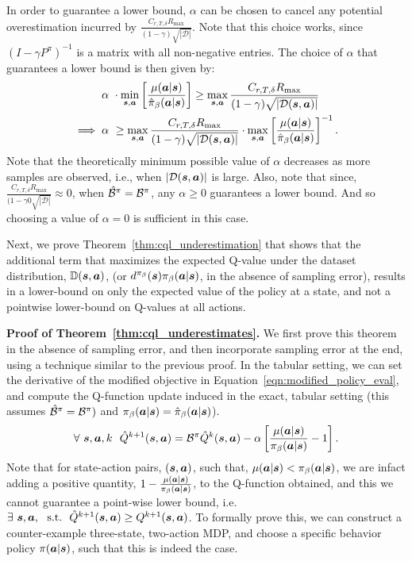 In order to guarantee a lower bound, $\alpha$ can be chosen to cancel any potential overestimation incurred by $\frac{C_{r, T, \delta} R_{\max}}{(1 - \gamma)\sqrt{|\mathcal{D}|}}$. Note that this  choice works, since $(I - \gamma P^\pi)^{-1}$ is a matrix with all non-negative entries. The choice of $\alpha$ that guarantees a lower bound is then given by:
\begin{align*}
    \alpha& ~ \cdot \min_{\boldsymbol{s}, \boldsymbol{a}} \left[\frac{\mu(\boldsymbol{a}|\boldsymbol{s})}{\hat{\pi}_\beta(\boldsymbol{a}|\boldsymbol{s})} \right] \geq \max_{\boldsymbol{s}, \boldsymbol{a}} \frac{C_{r, T, \delta} R_{\max}}{(1 - \gamma) \sqrt{|\mathcal{D}(\boldsymbol{s}, \boldsymbol{a})|}}\\
    \implies \alpha&~ \geq \max_{\boldsymbol{s}, \boldsymbol{a}} \frac{C_{r, T, \delta} R_{\max}}{(1 - \gamma) \sqrt{|\mathcal{D}(\boldsymbol{s}, \boldsymbol{a})|}} \cdot \max_{\boldsymbol{s}, \boldsymbol{a}} \left[\frac{\mu(\boldsymbol{a}|\boldsymbol{s})}{\hat{\pi}_\beta(\boldsymbol{a}|\boldsymbol{s})} \right]^{-1}.
\end{align*}
Note that the theoretically minimum possible value of $\alpha$ decreases as more samples are observed, i.e., when $|\mathcal{D}(\boldsymbol{s}, \boldsymbol{a})|$ is large. Also, note that since, $\frac{C_{r, T, \delta} R_{\max}}{(1 - \gamma0 \sqrt{|\mathcal{D}|}} \approx 0$, when $\hat{\mathcal{B}}^\pi = \mathcal{B}^\pi$, any $\alpha \geq 0$ guarantees a lower bound. And so choosing a value of $\alpha = 0$ is sufficient in this case.

Next, we prove Theorem~\ref{thm:cql_underestimation} that shows that the additional term that maximizes the expected Q-value under the dataset distribution, $\mathbb{D}(\boldsymbol{s}, \boldsymbol{a})$, (or $d^{\pi_\beta}(\boldsymbol{s}) {\pi_\beta}(\boldsymbol{a}|\boldsymbol{s})$, in the absence of sampling error), results in a lower-bound on only the expected value of the policy at a state, and not a pointwise lower-bound on Q-values at all actions.

\textbf{Proof of Theorem~\ref{thm:cql_underestimates}.} We first prove this theorem in the absence of sampling error, and then incorporate sampling error at the end, using a technique similar to the previous proof. In the tabular setting, we can set the derivative of the modified objective in Equation~\ref{eqn:modified_policy_eval}, and compute the Q-function update induced in the exact, tabular setting (this assumes $\hat{\mathcal{B}}^\pi = \mathcal{B}^\pi)$ and ${\pi_\beta}(\boldsymbol{a}|\boldsymbol{s}) = \hat{\pi}_\beta(\boldsymbol{a}|\boldsymbol{s})$).
\begin{equation}
    \forall ~\boldsymbol{s}, \boldsymbol{a}, k ~~ \hat{Q}^{k+1} (\boldsymbol{s}, \boldsymbol{a}) = \mathcal{B}^\pi \hat{Q}^k(\boldsymbol{s}, \boldsymbol{a}) - \alpha \left[\frac{\mu(\boldsymbol{a}|\boldsymbol{s})}{{\pi_\beta}(\boldsymbol{a}|\boldsymbol{s})} - 1 \right].
    \label{eqn:q_function_modified_eval}
\end{equation}
Note that for state-action pairs, $(\boldsymbol{s}, \boldsymbol{a})$, such that, $\mu(\boldsymbol{a}|\boldsymbol{s}) < {\pi_\beta}(\boldsymbol{a}|\boldsymbol{s})$, we are infact adding a positive quantity, $1 - \frac{\mu(\boldsymbol{a}|\boldsymbol{s})}{{\pi_\beta}(\boldsymbol{a}|\boldsymbol{s})}$, to the Q-function obtained, and this we cannot guarantee a point-wise lower bound, i.e. $\exists~ \boldsymbol{s}, \boldsymbol{a}, \text{~~s.t.}~~ \hat{Q}^{k+1}(\boldsymbol{s}, \boldsymbol{a}) \geq Q^{k+1}(\boldsymbol{s}, \boldsymbol{a})$. To formally prove this, we can construct a counter-example three-state, two-action MDP, and choose a specific behavior policy $\pi(\boldsymbol{a}|\boldsymbol{s})$, such that this is indeed the case.

